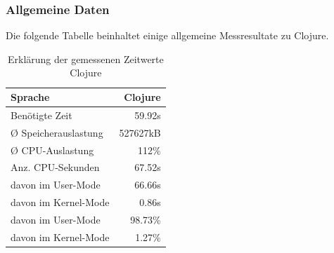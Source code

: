 \documentclass{fancydocument}
\begin{document}
\subsubsection{Allgemeine Daten}
Die folgende Tabelle beinhaltet einige allgemeine Messresultate zu Clojure. 
\begin{table}[h!]
\centering
\begin{tabular}{|p{6cm}|r|} \hline
Sprache & Clojure\\
\hline
Benötigte Zeit & 59.92s\\
\hline
Ø Speicherauslastung & 527627kB\\
\hline
Ø CPU-Auslastung & 112\%\\
\hline
Anz. CPU-Sekunden & 67.52s\\
\hline
davon im User-Mode & 66.66s\\
\hline
davon im Kernel-Mode & 0.86s\\
\hline
davon im User-Mode & 98.73\%\\
\hline
davon im Kernel-Mode & 1.27\%\\
\hline
\end{tabular}
\caption{Erklärung der gemessenen Zeitwerte Clojure}
\end{table}
\end{document}
